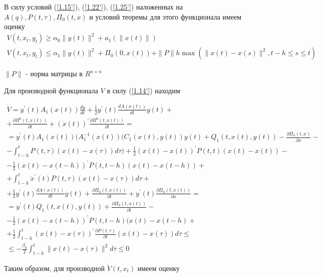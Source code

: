 В силу условий (\ref{1.15'}), (\ref{1.22'}), (\ref{1.25'}) наложенных на $A(q), P(t, \tau), \Pi_0(t, x)$ и условий теоремы для этого функционала имеем оценку
$$
\begin{array}{c}
	V(t, x_t, y_t) \ge \alpha_0 \| y(t) \|^2 + a_1 (\| x(t) \|)\\
	V(t, x_t, y_t) \le \alpha_1 \| y(t) \|^2 + \Pi_0 (0, x(t)) + \| P \| h \max (\| x(t) - x(s) \|^2, t-h \le s \le t)
\end{array}
$$

$\| P \|$ - норма матрицы в $R^{n \times n}$

Для производной функционала $V$ в силу (\ref{1.14'}) находим

$$
\begin{array}{c}
\displaystyle \dot V = y^{'} (t) A_1 (x(t)) \frac{dy}{dt} + \frac12 y^{'} (t) \frac{d A(x(t))}{dt} y(t) +\\+
\displaystyle \frac{\partial \Pi^0 (t, x(t))}{\partial t} + (\dot x (t))^{'} \frac{\partial \Pi^0 (t, x(t))}{\partial t} =\\
\displaystyle = y^{'} (t) A_1 (x(t)) ( A_1^{-1} (x(t)) (C_1 (x(t), y(t)) y(t) + Q_1 (t, x(t), y(t)) - \frac{\partial \Pi_0 (t, x)}{\partial x} -\\
\displaystyle - \int_{t - h}^{t} P(t, \tau) (x(t) - x(\tau)) d \tau) + \frac12 (x(t) - x(t))^{'} P(t, t) (x(t) - x(t)) -\\
\displaystyle - \frac12 (x(t) - x(t - h))^{'} P(t, t - h) (x(t) - x(t - h)) +\\
\displaystyle + \int_{t - h}^{t} \dot x^{'} (t) P(t, \tau) (x(t) - x(\tau)) d \tau +\\
\displaystyle + \frac12 y^{'}(t) \frac{d A(x(t))}{dt} y(t) + \frac{\partial \Pi_0 (t, x(t))}{\partial t} + y^{'}(t) \frac{\partial \Pi_0 (t, x(t))}{\partial x} =\\
\displaystyle = y^{'} (t) Q_1 (t, x(t), y(t)) + \frac{\partial \Pi_0 (t, x(t))}{\partial t} -\\
\displaystyle - \frac12 (x(t) - x(t - h))^{'} P (t, t - h) (x(t) - x(t - h) +\\
\displaystyle + \frac12 \int_{t - h}^{t} (x(t) - x(\tau))^{'} \frac{\partial P(t, \tau)}{\partial t} (x(t) - x(\tau)) d \tau \le\\
\displaystyle \le - \frac{\beta_0}{2} \int_{t-h}^{t} \| x(t) - x(\tau) \|^2 d \tau \le 0
\end{array}
$$

Таким образом, для производной $\dot V(t, x_t)$ имеем оценку

